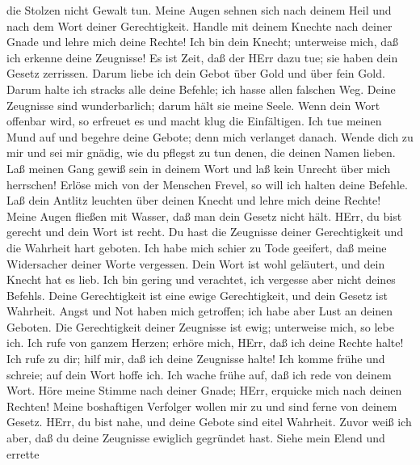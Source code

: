die Stolzen nicht Gewalt tun.  Meine Augen sehnen sich
nach deinem Heil und nach dem Wort deiner Gerechtigkeit. 
Handle mit deinem Knechte nach deiner Gnade und lehre mich deine Rechte!
 Ich bin dein Knecht; unterweise mich, daß ich erkenne
deine Zeugnisse!  Es ist Zeit, daß der HErr dazu tue; sie
haben dein Gesetz zerrissen.  Darum liebe ich dein Gebot
über Gold und über fein Gold.  Darum halte ich stracks
alle deine Befehle; ich hasse allen falschen Weg.  Deine
Zeugnisse sind wunderbarlich; darum hält sie meine Seele. 
Wenn dein Wort offenbar wird, so erfreuet es und macht klug die
Einfältigen.  Ich tue meinen Mund auf und begehre deine
Gebote; denn mich verlanget danach.  Wende dich zu mir und
sei mir gnädig, wie du pflegst zu tun denen, die deinen Namen lieben.
 Laß meinen Gang gewiß sein in deinem Wort und laß kein
Unrecht über mich herrschen!  Erlöse mich von der Menschen
Frevel, so will ich halten deine Befehle.  Laß dein
Antlitz leuchten über deinen Knecht und lehre mich deine Rechte!
 Meine Augen fließen mit Wasser, daß man dein Gesetz nicht
hält.  HErr, du bist gerecht und dein Wort ist recht.
 Du hast die Zeugnisse deiner Gerechtigkeit und die
Wahrheit hart geboten.  Ich habe mich schier zu Tode
geeifert, daß meine Widersacher deiner Worte vergessen. 
Dein Wort ist wohl geläutert, und dein Knecht hat es lieb.
 Ich bin gering und verachtet, ich vergesse aber nicht
deines Befehls.  Deine Gerechtigkeit ist eine ewige
Gerechtigkeit, und dein Gesetz ist Wahrheit.  Angst und
Not haben mich getroffen; ich habe aber Lust an deinen Geboten.
 Die Gerechtigkeit deiner Zeugnisse ist ewig; unterweise
mich, so lebe ich.  Ich rufe von ganzem Herzen; erhöre
mich, HErr, daß ich deine Rechte halte!  Ich rufe zu dir;
hilf mir, daß ich deine Zeugnisse halte!  Ich komme frühe
und schreie; auf dein Wort hoffe ich.  Ich wache frühe
auf, daß ich rede von deinem Wort.  Höre meine Stimme nach
deiner Gnade; HErr, erquicke mich nach deinen Rechten! 
Meine boshaftigen Verfolger wollen mir zu und sind ferne von deinem
Gesetz.  HErr, du bist nahe, und deine Gebote sind eitel
Wahrheit.  Zuvor weiß ich aber, daß du deine Zeugnisse
ewiglich gegründet hast.  Siehe mein Elend und errette
